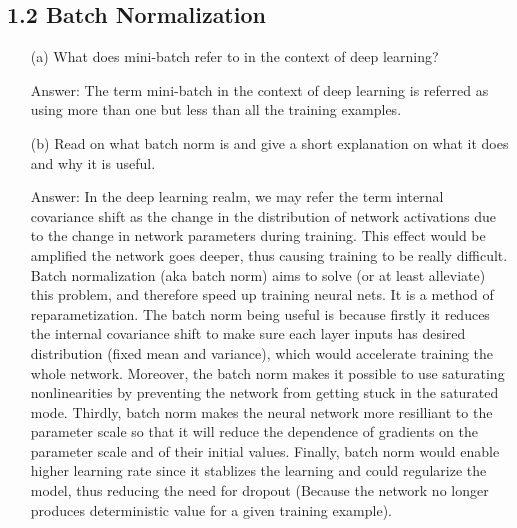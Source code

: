 \documentclass[12pt,letterpaper]{article}
\begin{document}
\subsection*{1.2 Batch Normalization}
\begin{itemize}
    \item[(a)]What does mini-batch refer to in the context of deep learning?
    
    Answer: The term mini-batch in the context of deep learning is referred as using more than one but less than all the training examples. 
    
    \item[(b)]Read on what batch norm is and give a short explanation on what it does and why it is useful.
    
    Answer: In the deep learning realm, we may refer the term internal covariance shift as the change in the distribution of network activations due to the change in network parameters during training. This effect would be amplified the network goes deeper, thus causing training to be really difficult. Batch normalization (aka batch norm) aims to solve (or at least alleviate) this problem, and therefore speed up training neural nets. It is a method of reparametization. The batch norm being useful is because firstly it reduces the internal covariance shift to make sure each layer inputs has desired distribution (fixed mean and variance), which would accelerate training the whole network. Moreover, the batch norm makes it possible to use saturating nonlinearities by preventing the network from getting stuck in the saturated mode. Thirdly, batch norm makes the neural network more resilliant to the parameter scale so that it will reduce the dependence of gradients on the parameter scale and of their initial values. Finally, batch norm would enable higher learning rate since it stablizes the learning and could regularize the model, thus reducing the need for dropout (Because the network no longer produces deterministic value for a given training example). 
\end{itemize}
\end{document}
